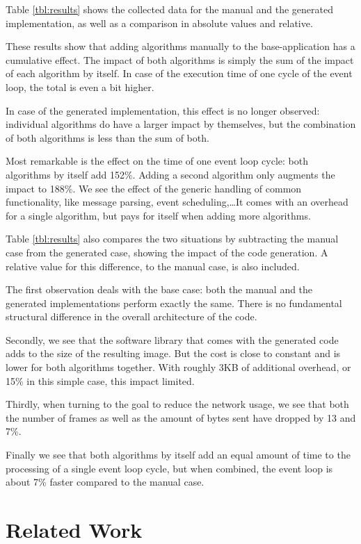 \documentclass[conference]{IEEEtran}
\begin{document}
Table \ref{tbl:results} shows the collected data for the manual and the
generated implementation, as well as a comparison in absolute values and
relative.

These results show that adding algorithms manually to the base-application has
a cumulative effect. The impact of both algorithms is simply the sum of the
impact of each algorithm by itself. In case of the execution time of one cycle
of the event loop, the total is even a bit higher.

In case of the generated implementation, this effect is no longer observed:
individual algorithms do have a larger impact by themselves, but the
combination of both algorithms is less than the sum of both.

Most remarkable is the effect on the time of one event loop cycle: both
algorithms by itself add 152\%. Adding a second algorithm only augments the
impact to 188\%. We see the effect of the generic handling of common
functionality, like message parsing, event scheduling,\dots It comes with an
overhead for a single algorithm, but pays for itself when adding more
algorithms.

Table \ref{tbl:results} also compares the two situations by subtracting the
manual case from the generated case, showing the impact of the code generation.
A relative value for this difference, to the manual case, is also included.

The first observation deals with the base case: both the manual and the
generated implementations perform exactly the same. There is no fundamental
structural difference in the overall architecture of the code.

Secondly, we see that the software library that comes with the generated code
adds to the size of the resulting image. But the cost is close to constant and
is lower for both algorithms together. With roughly 3KB of additional overhead,
or 15\% in this simple case, this impact limited.

Thirdly, when turning to the goal to reduce the network usage, we see that both
the number of frames as well as the amount of bytes sent have dropped by 13 and
7\%.

Finally we see that both algorithms by itself add an equal amount of time to
the processing of a single event loop cycle, but when combined, the event loop
is about 7\% faster compared to the manual case.

\section{Related Work}
\label{related}
\end{document}
